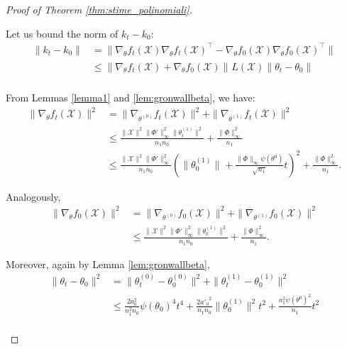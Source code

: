 \documentclass{article}
\theoremstyle{definition}
\theoremstyle{remark}
\numberwithin{equation}{section}
\newcommand{\X}{\mathcal{X}}
\newcommand{\s}{\psi}
\newcommand{\norm}[2]{
    \|#1\|_{#2}
}
\begin{document}
\begin{proof}[Proof of Theorem \ref{thm:stime_polinomiali}]
\begin{itemize}
        Let us bound the norm of $k_t-k_0$:
        \begin{align}
            \norm{k_t-k_0}{}&= \norm{\nabla_\theta f_t(\X)\nabla_\theta f_t(\X)^\top-\nabla_\theta f_0(\X)\nabla_\theta f_0(\X)^\top }{}\\
            &\le \norm{\nabla_\theta f_t(\X)+\nabla_\theta f_0(\X)}{}L(\X)\norm{\theta_t-\theta_0}{}\\
        \end{align}

        From Lemmas \ref{lemma1} and \ref{lem:gronwallbeta}, we have:
        \begin{align}
            \norm{\nabla_\theta f_t(\X)}{}^2 &=\norm{\nabla_{\theta^{(0)}}f_t(\X)}{}^2+\norm{\nabla_{\theta^{(1)}} f_t(\X)}{}^2\\
            &\le \frac{\norm{\X}{}^2\norm{\Phi'}{\infty}^2\norm{\theta^{(1)}_t}{}^2}{n_1n_0} + \frac{\norm{\Phi}{\infty}^2}{n_1}\\
            &\label{eqaux_delta1}\le \frac{\norm{\X}{}^2\norm{\Phi'}{\infty}^2}{n_1n_0}\left(\norm{\theta^{(1)}_0}{} + \frac{\norm{\Phi}{\infty}\s(\theta^0)}{\sqrt{n_1}}t\right)^2 + \frac{\norm{\Phi}{\infty}^2}{n_1}.
        \end{align}

        Analogously,
        \begin{align}
            \norm{\nabla_\theta f_0(\X)}{}^2 &=\norm{\nabla_{\theta^{(0)}}f_0(\X)}{}^2+\norm{\nabla_{\theta^{(1)}} f_0(\X)}{}^2\\
            &\label{eqaux_delta2}\le \frac{\norm{\X}{}^2\norm{\Phi'}{\infty}^2\norm{\theta^{(1)}_0}{}^2}{n_1n_0} + \frac{\norm{\Phi}{\infty}^2}{n_1}.
        \end{align}

        Moreover, again by Lemma \ref{lem:gronwallbeta},
        \begin{align}
            \norm{\theta_t-\theta_0}{}^2 &= \norm{\theta_t^{(0)}-\theta_0^{(0)}}{}^2 + \norm{\theta_t^{(1)}-\theta_0^{(1)}}{}^2 \\
            &\label{eqaux_delta3}\le \frac{2a_0^2}{n_1^2n_0}\s(\theta_0)^4t^4 + \frac{2{a'_0}^2}{n_1n_0}\norm{\theta^{(1)}_0}{}^2t^2 +\frac{a_1^2\s(\theta^0)^2}{n_1}t^2 \\
        \end{align}


\end{itemize}
\end{proof}
\end{document}

